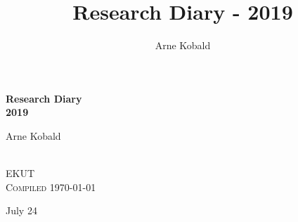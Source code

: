 \documentclass[letterpaper,11pt]{article}
\title{Research Diary - 2019}
\author{Arne Kobald}
\begin{document}
\begin{center} \begin{LARGE}
\textbf{Research Diary} \\[3mm]
\textbf{2019} \\[2cm]
\end{LARGE} \begin{large}
Arne Kobald \end{large} \\
EKUT \\[7in]
\textsc{Compiled \today}
\end{center}
\thispagestyle{empty}
\newpage



\logoPNG

{\Huge July 24}
\end{document}
